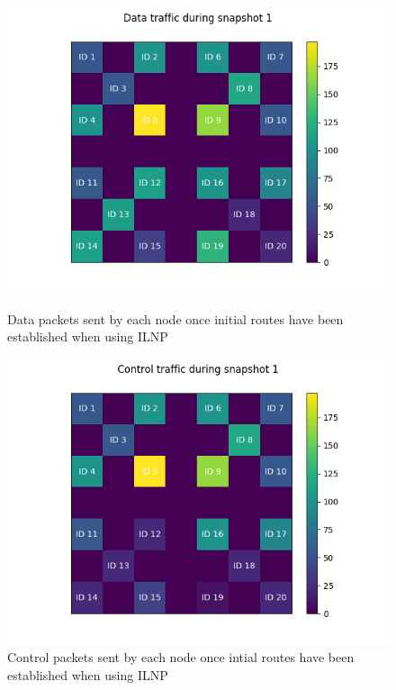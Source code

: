\documentclass[12pt]{article}
\begin{document}
\begin{figure}[!ht]
    \centering
    \begin{minipage}{0.45\textwidth}
        \centering
        \includegraphics[width=\textwidth]{images/ilnp/snapshot1-Data.png} %
        \caption{Data packets sent by each node once initial routes have been established when using ILNP}
        \label{fig:datasnaptwo}
    \end{minipage}\hfill
    \begin{minipage}{0.45\textwidth}
        \centering
       \includegraphics[width=\textwidth]{images/ilnp/snapshot1-Control.png} %
        \caption{Control packets sent by each node once intial routes have been established when using ILNP}
        \label{fig:ctrlsnaptwo}
    \end{minipage}
\end{figure}
\end{document}
